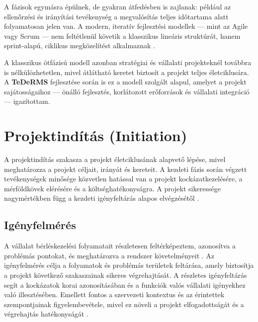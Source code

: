 A fázisok egymásra épülnek, de gyakran átfedésben is zajlanak: például az ellenőrzési és irányítási tevékenység a megvalósítás teljes időtartama alatt folyamatosan jelen van. 
A modern, iteratív fejlesztési modellek — mint az Agile vagy Scrum — nem feltétlenül követik a klasszikus lineáris struktúrát, 
hanem sprint-alapú, ciklikus megközelítést alkalmaznak \cite{Hajdu2014,Kaposi2019}.

A klasszikus ötfázisú modell azonban stratégiai és vállalati projekteknél továbbra is nélkülözhetetlen, 
mivel átlátható keretet biztosít a projekt teljes életciklusára. 
A \textbf{TeDeRMS} fejlesztése során is ez a modell szolgált alapul, amelyet a projekt sajátosságaihoz — önálló fejlesztés, korlátozott erőforrások és vállalati integráció — igazítottam.

\section{Projektindítás (Initiation)}

A projektindítás szakasza a projekt életciklusának alapvető lépése, mivel meghatározza a projekt céljait, irányát és kereteit. 
A kezdeti fázis során végzett tevékenységek minősége közvetlen hatással van a projekt kockázatkezelésére, a mérföldkövek elérésére és a költséghatékonyságra. 
A projekt sikeressége nagymértékben függ a kezdeti igényfeltárás alapos elvégzésétől \cite{Hajdu2014,Szalay2018,Kovacs2016,Kaposi2019}.

\subsection{Igényfelmérés}

A vállalat bérléskezelési folyamatait részletesen feltérképeztem, azonosítva a problémás pontokat, és meghatározva a rendszer követelményeit \cite{Szalay2018}.  
Az igényfelmérés célja a folyamatok és problémás területek feltárása, amely biztosítja a projekt következő szakaszainak sikeres végrehajtását.  
A részletes igényfeltárás segít a kockázatok korai azonosításában és a funkciók valós vállalati igényekhez való illesztésében.  
Emellett fontos a szervezeti kontextus és az érintettek szempontjainak figyelembevétele, mivel ez növeli a projekt elfogadottságát és a végrehajtás hatékonyságát \cite{Kovacs2016,Kaposi2019}.

